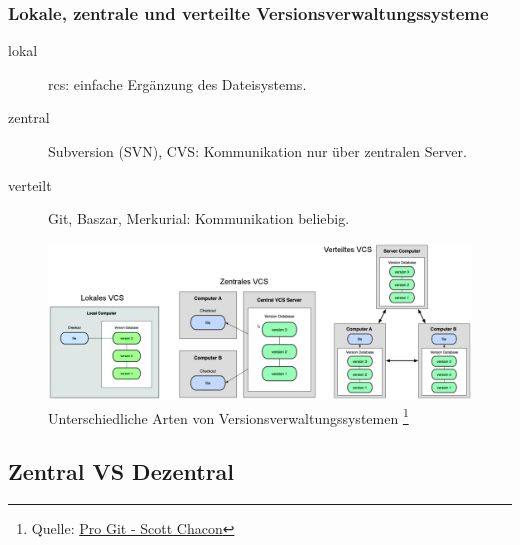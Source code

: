 \documentclass{beamer}
\begin{document}
\begin{frame}\frametitle{Lokale, zentrale und verteilte Versionsverwaltungssysteme}
\begin{description}
\item[lokal] rcs: einfache Ergänzung des Dateisystems.
\item[zentral] Subversion (SVN), CVS: Kommunikation nur über zentralen Server.
\item[verteilt] Git, Baszar, Merkurial: Kommunikation beliebig.

\end{description}

\begin{figure}
\includegraphics[scale=.15]{Bilder/VCSArten}
\caption{Unterschiedliche Arten von Versionsverwaltungssystemen
 \footnote{Quelle: \href{http://progit.org/}{Pro Git - Scott Chacon}}}
\end{figure}
\end{frame}

\subsection{Zentral VS Dezentral}
\end{document}
